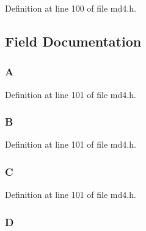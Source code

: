 Definition at line 100 of file md4.\+h.



\subsection{Field Documentation}
\subsubsection[{\texorpdfstring{A}{A}}]{ A}\hypertarget{struct_m_d4state__st_a744a1250e435f8b6aea1133e890b51b7}{}\label{struct_m_d4state__st_a744a1250e435f8b6aea1133e890b51b7}


Definition at line 101 of file md4.\+h.

\subsubsection[{\texorpdfstring{B}{B}}]{ B}\hypertarget{struct_m_d4state__st_a2ef246032ce4a2405bd607335b17a9bf}{}\label{struct_m_d4state__st_a2ef246032ce4a2405bd607335b17a9bf}


Definition at line 101 of file md4.\+h.

\subsubsection[{\texorpdfstring{C}{C}}]{ C}\hypertarget{struct_m_d4state__st_a45f02db51d7c709d8e825354986ff94b}{}\label{struct_m_d4state__st_a45f02db51d7c709d8e825354986ff94b}


Definition at line 101 of file md4.\+h.

\subsubsection[{\texorpdfstring{D}{D}}]{ D}\hypertarget{struct_m_d4state__st_a322ed02e1749a687524d3f872f008a8b}{}\label{struct_m_d4state__st_a322ed02e1749a687524d3f872f008a8b}


